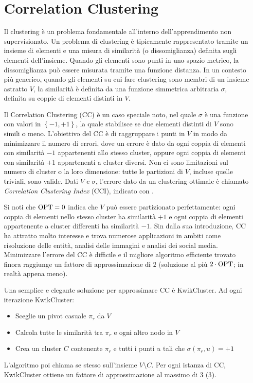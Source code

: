 \section{Correlation Clustering}

Il clustering è un problema fondamentale all'interno dell'apprendimento non supervisionato. Un problema di clustering è tipicamente rappresentato tramite un insieme di elementi e una misura di similarità (o dissomiglianza) definita sugli elementi dell'insieme. Quando gli elementi sono punti in uno spazio metrico, la dissomiglianza può essere misurata tramite una funzione distanza. In un contesto più generico, quando gli elementi su cui fare clustering sono membri di un insieme astratto $V$, la similarità è definita da una funzione simmetrica arbitraria $\sigma$, definita su coppie di elementi distinti in $V$.

Il Correlation Clustering (CC) è un caso speciale noto, nel quale $\sigma$ è una funzione con valori in $\left\{-1, +1\right\}$, la quale stabilisce se due elementi distinti di $V$ sono simili o meno. L'obiettivo del CC è di raggruppare i punti in $V$ in modo da minimizzare il numero di errori, dove un errore è dato da ogni coppia di elementi con similarità $-1$ appartenenti allo stesso cluster, oppure ogni coppia di elementi con similarità $+1$ appartenenti a cluster diversi. Non ci sono limitazioni sul numero di cluster o la loro dimensione: tutte le partizioni di $V$, incluse quelle triviali, sono valide. Dati $V$ e $\sigma$, l'errore dato da un clustering ottimale è chiamato \textit{Correlation Clustering Index} (CCI), indicato con \Opt.

Si noti che $\textnormal{OPT} = 0$ indica che $V$ può essere partizionato perfettamente: ogni coppia di elementi nello stesso cluster ha similarità $+1$ e ogni coppia di elementi appartenente a cluster differenti ha similarità $-1$. Sin dalla sua introduzione, CC ha attratto molto interesse e trova numerose applicazioni in ambiti come risoluzione delle entità, analisi delle immagini e analisi dei social media. Minimizzare l'errore del CC è difficile e il migliore algoritmo efficiente trovato finora raggiunge un fattore di approssimazione di 2  (soluzione al più $2 \cdot \textnormal{OPT}$; in realtà appena meno).

Una semplice e elegante soluzione per approssimare CC è KwikCluster. Ad ogni iterazione KwikCluster:
\begin{itemize}
    \item Sceglie un pivot casuale $\pi_r$ da $V$

    \item Calcola tutte le similarità tra $\pi_r$ e ogni altro nodo in $V$

    \item Crea un cluster $C$ contenente $\pi_r$ e tutti i punti $u$ tali che $\sigma (\pi_r, u) = +1$
\end{itemize}
L'algoritmo poi chiama se stesso sull'insieme $V \setminus C$. Per ogni istanza di CC, KwikCluster ottiene un fattore di approssimazione al massimo di 3 (3\Opt).


